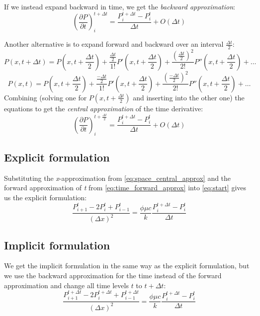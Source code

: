 If we instead expand backward in time, we get the \emph{backward approximation}:
\begin{equation}
  \left( \frac{\partial P}{\partial t} \right)_i^{t+\Delta t}
  = \frac{P_i^{t+\Delta t} - P_i^t}{\Delta t} + O(\Delta t)
  \label{eq:time_backward_approx}
\end{equation}

Another alternative is to expand forward and backward over an interval $\frac{\Delta t}{2}$:
\begin{equation}
  P(x,t+\Delta t) = P \left( x,t+\frac{\Delta t}{2} \right)
  + \frac{\frac{\Delta t}{2}}{1!} P'\left( x,t+\frac{\Delta t}{2} \right)
  + \frac{(\frac{\Delta t}{2})^2}{2!} P''\left( x,t+\frac{\Delta t}{2} \right)
  + \ldots
\end{equation}
\begin{equation}
  P(x,t) = P \left( x,t+\frac{\Delta t}{2} \right)
  + \frac{\frac{-\Delta t}{2}}{1!} P'\left( x,t+\frac{\Delta t}{2} \right)
  + \frac{(\frac{-\Delta t}{2})^2}{2!} P''\left( x,t+\frac{\Delta t}{2} \right)
  + \ldots
\end{equation}
Combining (solving one for $P(x,t+\frac{\Delta t}{2})$ and inserting into the other one) the equations to get the \emph{central approximation} of the time derivative:
\begin{equation}
  \left( \frac{\partial P}{\partial t} \right)_i^{t+\frac{\Delta t}{2}}
  = \frac{P_i^{t+\Delta t}-P_i^t}{\Delta t} + O(\Delta t)
  \label{eq:time_central_approx}
\end{equation}

\subsection{Explicit formulation} %
\label{sub:explicit_formulation}
Substituting the \emph{x}-approximation from \eqref{eq:space_central_approx} and the forward approximation of \emph{t} from \eqref{eq:time_forward_approx} into \eqref{eq:start} gives us the explicit formulation:
\begin{equation}
  \frac{P_{i+1}^t - 2P_i^t + P_{i-1}^t}{(\Delta x)^2} = \frac{\phi \mu c}{k} \frac{P_i^{t+\Delta t} - P_i^t}{\Delta t}
  \label{eq:explicit}
\end{equation}

\subsection{Implicit formulation} %
\label{sub:implicit_formulation}
We get the implicit formulation in the same way as the explicit formulation, but we use the backward approximation for the time instead of the forward approximation and change all time levels $t$ to $t+\Delta t$:
\begin{equation}
  \frac{P_{i+1}^{t+\Delta t} - 2P_i^{t+\Delta t} + P_{i-1}^{t+\Delta t}}{(\Delta x)^2} = \frac{\phi \mu c}{k} \frac{P_i^{t+\Delta t} - P_i^t}{\Delta t}
  \label{eq:implicit}
\end{equation}

